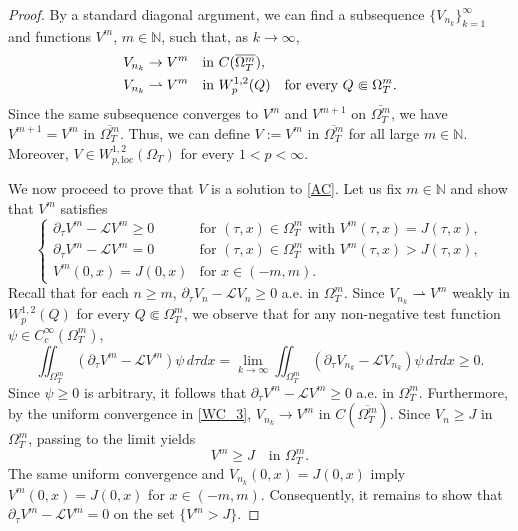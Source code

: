 \documentclass[11pt, a4paper, leqno]{amsart}
\numberwithin{equation}{section}
\theoremstyle{plain}
\theoremstyle{definition}
\theoremstyle{remark}
\def\ge{\geqslant}
\def\geq{\geqslant}
\begin{document}
\begin{proof}
By a standard diagonal argument, 
we can find a subsequence $\{V_{n_k}\}_{k=1}^{\infty}$
{and functions $V^m$, $m\in\mathbb N$,}
such that, as $k\rightarrow\infty$,
{
\begin{align}\label{WC_3}
    V_{n_k}&\rightarrow V^m
    \quad \text{in }C(\overline{\Omega_T^m}), \notag\\
    V_{n_k}&\rightharpoonup V^m
    \quad \text{in }W^{1,2}_p(Q)
    \quad\text{for every }Q\Subset\Omega_T^m .
\end{align}
}
{
Since the same subsequence converges to $V^m$ and $V^{m+1}$
on $\overline{\Omega_T^m}$, we have
$V^{m+1}=V^m$ in $\overline{\Omega_T^m}$.
}
Thus, we can define
$V:=V^m$ in $\overline{\Omega_T^m}$ for all large $m\in \mathbb N$.
{
Moreover, $V\in W^{1,2}_{p,\mathrm{loc}}(\Omega_T)$
for every $1<p<\infty$.
}

We now proceed to prove that $V$ is a solution to \eqref{AC}. 
Let us fix $m \in \mathbb{N}$ and show that $V^m$ satisfies
\begin{equation*}
    \begin{cases}
    \partial_\tau V^m - \mathcal{L}V^m \geq 0 & \text{for } (\tau,x) \in \Omega^m_T \text{ with } V^m(\tau,x) = J(\tau,x), \\
    \partial_\tau V^m - \mathcal{L}V^m = 0    & \text{for } (\tau,x) \in \Omega^m_T \text{ with } V^m(\tau,x) > J(\tau,x), \\
    V^m(0,x) = J(0,x)                         & \text{for } x \in (-m,m).
    \end{cases}
\end{equation*}
Recall that for each $n \ge m$, $\partial_\tau V_{n} - \mathcal{L} V_{n} \geq 0$ a.e. in $\Omega_T^m$. 
{
Since $V_{n_k}\rightharpoonup V^m$ weakly in
$W^{1,2}_p(Q)$ for every $Q\Subset\Omega_T^m$,
}
we observe that for any non-negative test function $\psi \in C_c^\infty(\Omega_T^m)$,
\begin{equation*}
    \iint_{\Omega_T^m} (\partial_\tau V^m - \mathcal{L} V^m) \psi \, d\tau dx
    =
    {\lim_{k \to \infty}}
    \iint_{\Omega_T^m}
    (\partial_\tau {V_{n_k}}-\mathcal{L}{V_{n_k}})
    \psi \, d\tau dx
    \ge 0.
\end{equation*}
Since $\psi \ge 0$ is arbitrary, it follows that $\partial_\tau V^m - \mathcal{L} V^m \ge 0$ a.e. in $\Omega_T^m$. 
{
Furthermore, by the uniform convergence in \eqref{WC_3},
$V_{n_k}\to V^m$ in $C(\overline{\Omega_T^m})$.
}
Since $V_n \ge J$ in $\Omega_T^m$, passing to the limit yields
\[ V^m \geq J \quad \text{in } \Omega^m_T. \]
{
The same uniform convergence and
$V_{n_k}(0,x)=J(0,x)$ imply
$V^m(0,x)=J(0,x)$ for $x\in(-m,m)$.
}
Consequently, it remains to show that $\partial_\tau V^m - \mathcal{L} V^m = 0$ on the set $\{V^m > J\}$.


\end{proof}
\end{document}
